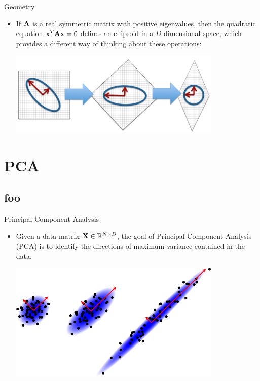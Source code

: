 \documentclass[serif,xcolor=pdftex,dvipsnames,table,hyperref={bookmarks=false,breaklinks}]{beamer}
\begin{document}
\begin{frame}[t]{Geometry}
 
\begin{itemize}

\item If ${\mathbf{A}}$ is a real symmetric matrix with positive eigenvalues, then 
the quadratic equation ${\mathbf{x}}^T{\mathbf{A}}{\mathbf{x}}=0$ defines an ellipsoid in a 
$D$-dimensional space, which provides a different way of thinking about these 
operations:

\pause
\center
\includegraphics[width=4in]{../Figures/eigen_basis_change.png}

\end{itemize} 
\end{frame}

\section{PCA}
\subsection{foo}

\begin{frame}[t]{Principal Component Analysis}
 
\begin{itemize}
\item Given a data matrix ${\mathbf{X}}\in \mathbb{R}^{N\times D}$, 
the goal of Principal Component Analysis (PCA) is to identify the directions
of maximum variance contained in the data.

\pause
\includegraphics[width=4in]{../Figures/pca1.png}

\end{itemize} 
\end{frame}
\end{document}
